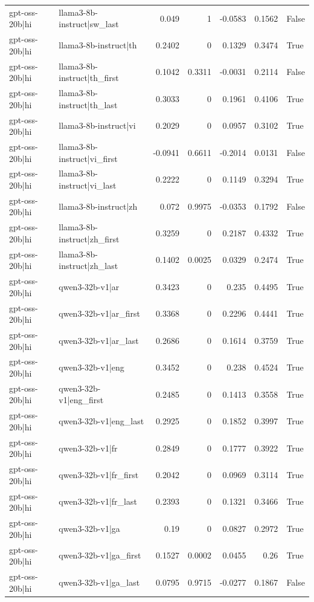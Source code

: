 \begin{table}
\begin{tabular}{l l r r r r l}
gpt-oss-20b|hi & llama3-8b-instruct|sw_last & 0.049 & 1 & -0.0583 & 0.1562 & False \\
gpt-oss-20b|hi & llama3-8b-instruct|th & 0.2402 & 0 & 0.1329 & 0.3474 & True \\
gpt-oss-20b|hi & llama3-8b-instruct|th_first & 0.1042 & 0.3311 & -0.0031 & 0.2114 & False \\
gpt-oss-20b|hi & llama3-8b-instruct|th_last & 0.3033 & 0 & 0.1961 & 0.4106 & True \\
gpt-oss-20b|hi & llama3-8b-instruct|vi & 0.2029 & 0 & 0.0957 & 0.3102 & True \\
gpt-oss-20b|hi & llama3-8b-instruct|vi_first & -0.0941 & 0.6611 & -0.2014 & 0.0131 & False \\
gpt-oss-20b|hi & llama3-8b-instruct|vi_last & 0.2222 & 0 & 0.1149 & 0.3294 & True \\
gpt-oss-20b|hi & llama3-8b-instruct|zh & 0.072 & 0.9975 & -0.0353 & 0.1792 & False \\
gpt-oss-20b|hi & llama3-8b-instruct|zh_first & 0.3259 & 0 & 0.2187 & 0.4332 & True \\
gpt-oss-20b|hi & llama3-8b-instruct|zh_last & 0.1402 & 0.0025 & 0.0329 & 0.2474 & True \\
gpt-oss-20b|hi & qwen3-32b-v1|ar & 0.3423 & 0 & 0.235 & 0.4495 & True \\
gpt-oss-20b|hi & qwen3-32b-v1|ar_first & 0.3368 & 0 & 0.2296 & 0.4441 & True \\
gpt-oss-20b|hi & qwen3-32b-v1|ar_last & 0.2686 & 0 & 0.1614 & 0.3759 & True \\
gpt-oss-20b|hi & qwen3-32b-v1|eng & 0.3452 & 0 & 0.238 & 0.4524 & True \\
gpt-oss-20b|hi & qwen3-32b-v1|eng_first & 0.2485 & 0 & 0.1413 & 0.3558 & True \\
gpt-oss-20b|hi & qwen3-32b-v1|eng_last & 0.2925 & 0 & 0.1852 & 0.3997 & True \\
gpt-oss-20b|hi & qwen3-32b-v1|fr & 0.2849 & 0 & 0.1777 & 0.3922 & True \\
gpt-oss-20b|hi & qwen3-32b-v1|fr_first & 0.2042 & 0 & 0.0969 & 0.3114 & True \\
gpt-oss-20b|hi & qwen3-32b-v1|fr_last & 0.2393 & 0 & 0.1321 & 0.3466 & True \\
gpt-oss-20b|hi & qwen3-32b-v1|ga & 0.19 & 0 & 0.0827 & 0.2972 & True \\
gpt-oss-20b|hi & qwen3-32b-v1|ga_first & 0.1527 & 0.0002 & 0.0455 & 0.26 & True \\
gpt-oss-20b|hi & qwen3-32b-v1|ga_last & 0.0795 & 0.9715 & -0.0277 & 0.1867 & False \\

\end{tabular}
\end{table}
